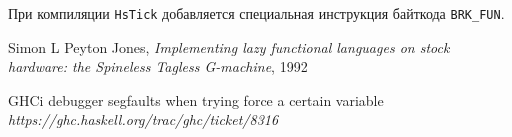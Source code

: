 \documentclass[fontsize=14pt, paper=a4, pagesize, DIV=calc]{scrartcl}
\def\code#1{\texttt{#1}}
\begin{document}
При компиляции \code{HsTick} добавляется специальная инструкция байткода
\code{BRK\_FUN}.

\begin{thebibliography}{9}

Simon L Peyton Jones,
\emph{Implementing lazy functional languages on stock hardware: the Spineless
Tagless G-machine}, 1992

GHCi debugger segfaults when trying force a certain variable
\emph{https://ghc.haskell.org/trac/ghc/ticket/8316}

\end{thebibliography}
\end{document}
